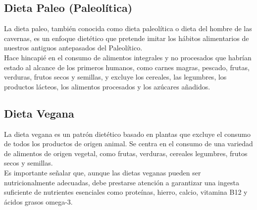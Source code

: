 \documentclass[12pt,a4paper]{article}
\begin{document}
\subsection{Dieta Paleo (Paleolítica)}
\cite{marvastipopular} La dieta paleo, también conocida como dieta 
paleolítica o dieta del hombre de las cavernas, es un enfoque 
dietético que pretende imitar los hábitos alimentarios de nuestros 
antiguos antepasados del Paleolítico. \\

Hace hincapié en el consumo de alimentos integrales y no procesados 
que habrían estado al alcance de los primeros humanos, como carnes magras, 
pescado, frutas, verduras, frutos secos y semillas, y excluye los cereales, 
las legumbres, los productos lácteos, los alimentos procesados y los 
azúcares añadidos.

\subsection{Dieta Vegana}
\cite{marvastipopular} La dieta vegana es un patrón dietético basado en 
plantas que excluye el consumo de todos los productos de origen animal. Se 
centra en el consumo de una variedad de alimentos de origen vegetal, como 
frutas, verduras, cereales legumbres, frutos secos y semillas.\\

Es importante señalar que, aunque las dietas veganas pueden ser 
nutricionalmente adecuadas, debe prestarse atención a garantizar una 
ingesta suficiente de nutrientes esenciales como proteínas, hierro, 
calcio, vitamina B12 y ácidos grasos omega-3.

\newpage

\printbibliography[heading=bibintoc,title={Referencias Bibliográficas}]
\end{document}
